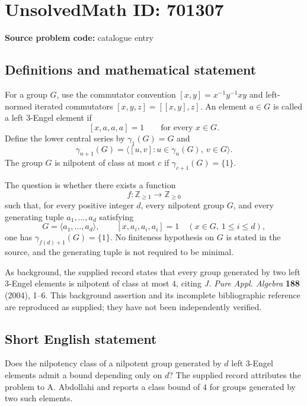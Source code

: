 \documentclass[11pt]{article}
\newcommand{\Z}{\mathbb{Z}}
\begin{document}
\section*{UnsolvedMath ID: 701307}
\textbf{Source problem code:} catalogue entry
\subsection{Definitions and mathematical statement}
For a group \(G\), use the commutator convention \([x,y]=x^{-1}y^{-1}xy\) and left-normed iterated commutators \([x,y,z]=[[x,y],z]\). An element \(a\in G\) is called a left \(3\)-Engel element if
\[
[x,a,a,a]=1\qquad\text{for every }x\in G.
\]
Define the lower central series by \(\gamma_1(G)=G\) and
\[
\gamma_{n+1}(G)=\langle [u,v]:u\in\gamma_n(G),\ v\in G\rangle.
\]
The group \(G\) is nilpotent of class at most \(c\) if \(\gamma_{c+1}(G)=\{1\}\).

The question is whether there exists a function
\[
f:\Z_{\geq 1}\longrightarrow\Z_{\geq 0}
\]
such that, for every positive integer \(d\), every nilpotent group \(G\), and every generating tuple \(a_1,\ldots,a_d\) satisfying
\[
G=\langle a_1,\ldots,a_d\rangle,
\qquad
[x,a_i,a_i,a_i]=1
\quad(x\in G,\ 1\leq i\leq d),
\]
one has \(\gamma_{f(d)+1}(G)=\{1\}\). No finiteness hypothesis on \(G\) is stated in the source, and the generating tuple is not required to be minimal.

As background, the supplied record states that every group generated by two left \(3\)-Engel elements is nilpotent of class at most \(4\), citing \emph{J. Pure Appl. Algebra} \textbf{188} (2004), 1--6. This background assertion and its incomplete bibliographic reference are reproduced as supplied; they have not been independently verified.
\subsection{Short English statement}
Does the nilpotency class of a nilpotent group generated by \(d\) left \(3\)-Engel elements admit a bound depending only on \(d\)? The supplied record attributes the problem to A. Abdollahi and reports a class bound of \(4\) for groups generated by two such elements.
\end{document}
